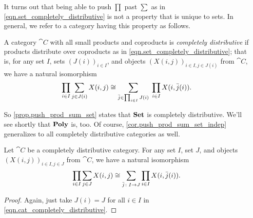 \documentclass[Book-Poly]{subfiles}
\begin{document}
It turns out that being able to push $\prod$ past $\sum$ as in \eqref{eqn.set_completely_distributive} is not a property that is unique to sets.
In general, we refer to a category having this property as follows.

\begin{definition}
A category $\cat{C}$ with all small products and coproducts is \emph{completely distributive} if products distribute over coproducts as in \eqref{eqn.set_completely_distributive}; that is, for any set $I$, sets $(J(i))_{i\in I}$, and objects $(X(i,j))_{i\in I,j\in J(i)}$ from $\cat{C}$, we have a natural isomorphism
\begin{equation}\label{eqn.cat_completely_distributive}
\prod_{i\in I}\sum_{j\in J(i)}X(i,j)
\cong
\sum_{\bar{j}\in \prod_{i\in I}J(i)}\;\prod_{i\in I}X(i,\bar{j}(i)).
\end{equation}
\end{definition}

So \cref{prop.push_prod_sum_set} states that $\mathbf{Set}$ is completely distributive.
We'll see shortly that $\mathbf{Poly}$ is, too.
Of course, \cref{cor.push_prod_sum_set_indep} generalizes to all completely distributive categories as well.

\begin{corollary} \label{cor.push_prod_sum_obj_indep}
Let $\cat{C}$ be a completely distributive category.
For any set $I$, set $J$, and objects $(X(i, j))_{i \in I, j \in J}$ from $\cat{C}$, we have a natural isomorphism
\begin{equation} \label{eqn.push_prod_sum_obj_indep}
    \prod_{i\in I}\sum_{j\in J}X(i,j)\cong\sum_{\bar{j}\colon I\to J}\prod_{i\in I}X(i,\bar{j}(i)).
\end{equation}
\end{corollary}
\begin{proof}
Again, just take $J(i) = J$ for all $i \in I$ in \eqref{eqn.cat_completely_distributive}.
\end{proof}
\end{document}
